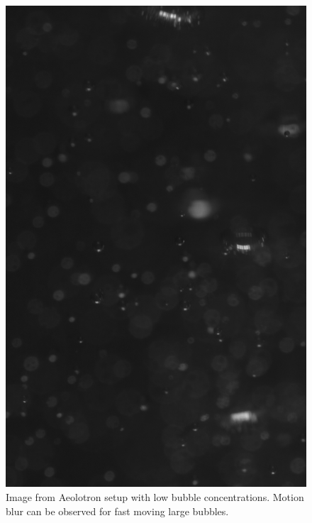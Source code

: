 \begin{figure}
	\centering
	\includegraphics[scale=0.3]{images/aeolotron_result_raw.png}
	\caption{Image from Aeolotron setup with low bubble concentrations. Motion blur can be observed for fast moving large bubbles.}
\end{figure}